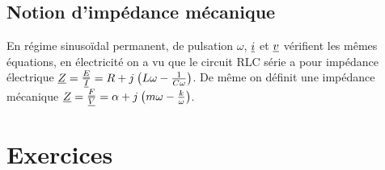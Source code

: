 \subsection{Notion d'impédance mécanique}

En régime sinusoïdal permanent, de pulsation \(\omega\), \(\underline{i}\) et \(\underline{v}\) 
vérifient les mêmes équations, en électricité on a vu que le circuit RLC série 
a pour impédance électrique \(\underline{Z} = \frac{\underline{E}}{\underline{I}} = R + {j\mkern1mu}\left(L\omega 
-\frac{1}{C\omega}\right)\). De même on définit une impédance mécanique \(\underline{Z} = 
\frac{\underline{F}}{\underline{V}} = \alpha +{j\mkern1mu}\left(m\omega -\frac{k}{\omega}\right)\).

\section{Exercices}
